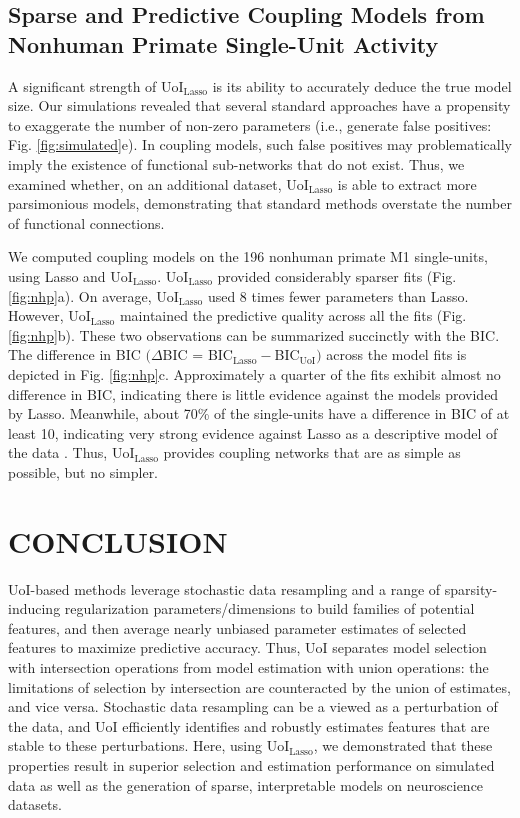\documentclass[letterpaper, 10 pt, conference]{ieeeconf}  %
\begin{document}
\subsection{Sparse and Predictive Coupling Models from Nonhuman Primate Single-Unit Activity}
A significant strength of UoI$_{\text{Lasso}}$ is its ability to accurately deduce the true model size. Our simulations revealed that several standard approaches have a propensity to exaggerate the number of non-zero parameters (i.e., generate false positives: Fig. \ref{fig:simulated}e). In coupling models, such false positives may problematically imply the existence of functional sub-networks that do not exist. Thus, we examined whether, on an additional dataset, UoI$_{\text{Lasso}}$ is able to extract more parsimonious models, demonstrating that standard methods overstate the number of functional connections.

We computed coupling models on the 196 nonhuman primate M1 single-units, using  Lasso and UoI$_{\text{Lasso}}$. UoI$_{\text{Lasso}}$ provided considerably sparser fits (Fig. \ref{fig:nhp}a). On average, UoI$_{\text{Lasso}}$ used 8 times fewer parameters than Lasso. However, UoI$_{\text{Lasso}}$ maintained the predictive quality across all the fits (Fig. \ref{fig:nhp}b). These two observations can be summarized succinctly with the BIC. The difference in BIC $(\Delta$BIC = BIC$_{\text{Lasso}}-$BIC$_{\text{UoI}})$ across the model fits is depicted in Fig. \ref{fig:nhp}c. Approximately a quarter of the fits exhibit almost no difference in BIC, indicating there is little evidence against the models provided by Lasso.  Meanwhile, about 70\% of the single-units have a difference in BIC of at least 10, indicating very strong evidence against Lasso as a descriptive model of the data \cite{kass1995}. Thus, UoI$_{\text{Lasso}}$ provides coupling networks that are as simple as possible, but no simpler. 

\section{CONCLUSION}

UoI-based methods leverage stochastic data resampling and a range of sparsity-inducing regularization parameters/dimensions to build families of potential features, and then average nearly unbiased parameter estimates of selected features to maximize predictive accuracy. Thus, UoI separates model selection with intersection operations from model estimation with union operations: the limitations of selection by intersection are counteracted by the union of estimates, and vice versa. Stochastic data resampling can be a viewed as a perturbation of the data, and UoI efficiently identifies and robustly estimates features that are stable to these perturbations. Here, using UoI$_{\text{Lasso}}$, we demonstrated that these properties result in superior selection and estimation performance on simulated data as well as the generation of sparse, interpretable models on neuroscience datasets.
\end{document}
